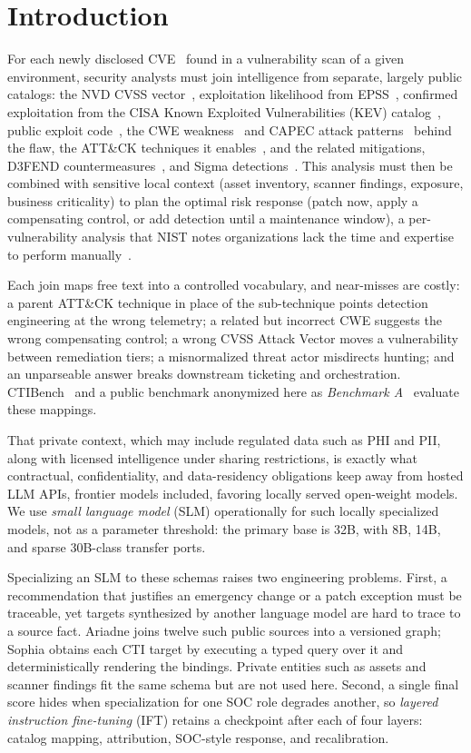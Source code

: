 \documentclass[conference]{IEEEtran}
\begin{document}
\section{Introduction}
For each newly disclosed CVE~\cite{cve} found in a vulnerability scan of a given environment, security analysts must join intelligence from separate, largely public catalogs: the NVD CVSS vector~\cite{nvd}, exploitation likelihood from EPSS~\cite{jacobs2021epss}, confirmed exploitation from the CISA Known Exploited Vulnerabilities (KEV) catalog~\cite{cisakev}, public exploit code~\cite{exploitdb,pocingithub}, the CWE weakness~\cite{cwe} and CAPEC attack patterns~\cite{capec} behind the flaw, the ATT\&CK techniques it enables~\cite{strom2018attack}, and the related mitigations, D3FEND countermeasures~\cite{d3fend}, and Sigma detections~\cite{sigma}. This analysis must then be combined with sensitive local context (asset inventory, scanner findings, exposure, business criticality) to plan the optimal risk response (patch now, apply a compensating control, or add detection until a maintenance window), a per-vulnerability analysis that NIST notes organizations lack the time and expertise to perform manually~\cite{nist80040r4}.

Each join maps free text into a controlled vocabulary, and near-misses are costly: a parent ATT\&CK technique in place of the sub-technique points detection engineering at the wrong telemetry; a related but incorrect CWE suggests the wrong compensating control; a wrong CVSS Attack Vector moves a vulnerability between remediation tiers; a misnormalized threat actor misdirects hunting; and an unparseable answer breaks downstream ticketing and orchestration. CTIBench~\cite{ctibench} and a public benchmark anonymized here as \emph{Benchmark A}~\cite{anonbench} evaluate these mappings.

That private context, which may include regulated data such as PHI and PII, along with licensed intelligence under sharing restrictions, is exactly what contractual, confidentiality, and data-residency obligations keep away from hosted LLM APIs, frontier models included, favoring locally served open-weight models. We use \emph{small language model} (SLM) operationally for such locally specialized models, not as a parameter threshold: the primary base is 32B, with 8B, 14B, and sparse 30B-class transfer ports.

Specializing an SLM to these schemas raises two engineering problems. First, a recommendation that justifies an emergency change or a patch exception must be traceable, yet targets synthesized by another language model are hard to trace to a source fact. Ariadne joins twelve such public sources into a versioned graph; Sophia obtains each CTI target by executing a typed query over it and deterministically rendering the bindings. Private entities such as assets and scanner findings fit the same schema but are not used here. Second, a single final score hides when specialization for one SOC role degrades another, so \emph{layered instruction fine-tuning} (IFT) retains a checkpoint after each of four layers: catalog mapping, attribution, SOC-style response, and recalibration.
\end{document}
